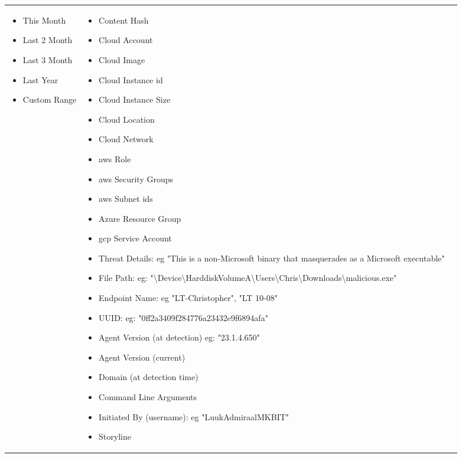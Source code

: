 \begin{longtable}{|p{4cm}|p{4cm}|p{8cm}|}
\begin{itemize}
            \item This Month
            \item Last 2 Month
            \item Last 3 Month
            \item Last Year
            \item Custom Range
      \end{itemize}                     &
      \begin{itemize}
            \item Content Hash
            \item Cloud Account
            \item Cloud Image
            \item Cloud Instance \acrshort{id}
            \item  Cloud Instance Size
            \item Cloud Location
            \item Cloud Network
            \item   \acrshort{aws} Role
            \item   \acrshort{aws} Security Groups
            \item   \acrshort{aws} Subnet \acrshort{id}s
            \item  Azure Resource Group
            \item \acrshort{gcp} Service Account
            \item Threat Details: \acrshort{eg} "This is a non-Microsoft binary that masquerades as a Microsoft executable"
            \item File Path: \acrshort{eg}: "\textbackslash Device\textbackslash HarddiskVolumeA\textbackslash Users\textbackslash Chris\textbackslash Downloads\textbackslash malicious.exe"
            \item Endpoint Name: \acrshort{eg} "LT-Christopher", "LT 10-08"
            \item \gls{UUID}: \acrshort{eg}: "0ff2a3409f284776a23432e9f6894afa"
            \item Agent Version (at detection) \acrshort{eg}: "23.1.4.650"
            \item Agent Version (current)
            \item Domain (at detection time)
            \item Command Line Arguments
            \item Initiated By (username): \acrshort{eg} "LuukAdmiraalMKBIT"
            \item Storyline

\end{itemize}
\end{longtable}
